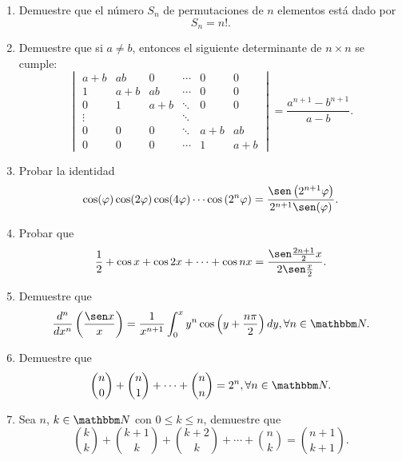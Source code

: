 \begin{enumerate}
    \item Demuestre que el número $S_n$ de permutaciones de $n$ elementos está dado por
    $$S_n=n!.$$
    \item Demuestre que si $a \neq b$, entonces el siguiente determinante de $n \times n$ se cumple:
    $$
    \begin{vmatrix}
        a+b & ab & 0 & \cdots & 0 & 0 \\
        1 & a+b & ab & \cdots & 0 & 0 \\
        0 & 1 & a+b & \ddots & 0 & 0 \\
        \vdots & & & \ddots & \\
        0 & 0 & 0 & \ddots & a+b & ab \\
        0 & 0 & 0 & \cdots & 1 & a+b
    \end{vmatrix} = \frac{a^{n+1}-b^{n+1}}{a-b}.
    $$
    \item Probar la identidad
    $$\cos (\varphi) \cos (2\varphi) \cos (4\varphi) \cdots \cos \left( 2^n \varphi \right)=\frac{\sen \left( 2^{n+1} \varphi \right)}{2^{n+1} \sen (\varphi)}.$$
    \item Probar que
    $$\frac{1}{2}+\cos x +\cos 2x +\cdots +\cos nx=\frac{ \sen \frac{2n+1}{2}x}{2\sen \frac{x}{2}}.$$
    \item Demuestre que
    $$\frac{d^n}{dx^n}\left( \frac{\sen x}{x} \right) = \frac{1}{x^{n+1}} \int_{0}^{x} y^n \cos \left( y+\frac{n\pi}{2} \right) dy, \forall n \in \NN.$$
    \item Demuestre que
    $$\binom{n}{0}+\binom{n}{1}+\cdots +\binom{n}{n}=2^n, \forall n \in \NN.$$
    \item Sea $n$, $k \in \NN$ con $0 \leq k \leq n$, demuestre que
    $$\binom{k}{k}+\binom{k+1}{k}+\binom{k+2}{k}+\cdots +\binom{n}{k}=\binom{n+1}{k+1}.$$
\end{enumerate}